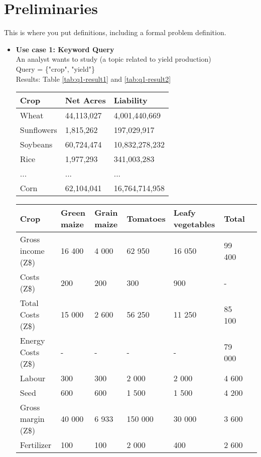 \section{Preliminaries}
\label{sec:preliminaries}
This is where you put definitions, including a formal problem definition.

\begin{itemize}
	\item \textbf{Use case 1: Keyword Query}\\
	An analyst wants to study (a topic related to yield production)\\
	Query = \{"crop", "yield"\}\\
	Results: Table \ref{tab:q1-result1} and \ref{tab:q1-result2}
	\begin{table*}[t]
		\setlength{\tabcolsep}{0.9\tabcolsep}
		\begin{tabular}{ |l|l|l|  }
			\hline
			Crop	& Net Acres	& Liability\\
			\hline
			Wheat 	& 44,113,027 	& 4,001,440,669\\
			Sunflowers 	& 1,815,262 	& 197,029,917\\
			Soybeans 	& 60,724,474 	& 10,832,278,232\\
			Rice 	& 1,977,293 	& 341,003,283\\
			...		& ...			& ...\\
			Corn 	& 62,104,041 	& 16,764,714,958\\
			\hline
			
		\end{tabular}
	\vspace{.2cm}
	\label{tab:q1-result1}
	\caption{2006 Top ten insured crops by net acres}
	\end{table*}
	
	\begin{table*}[t]
		\setlength{\tabcolsep}{0.9\tabcolsep}
		\begin{tabular}{ |l|l|l|l|l|l|l|  }
			\hline
			Crop 	&Green maize 	&Grain maize 	&Tomatoes 	&Leafy vegetables 	&Total\\
			\hline
			Gross income (Z\$) 	&16 400 	&4 000 	&62 950 	&16 050 	&99 400\\
			Costs (Z\$) 		&200 	&200 	&300 	&900 & - \\
			Total Costs (Z\$)  &15 000 	&2 600 	&56 250 	&11 250 	&85 100\\
			Energy Costs (Z\$) & - & - & -  & - &79 000\\
			Labour 	&300 	&300 	&2 000 	&2 000 &	4 600\\
			Seed &	600 	&600 &	1 500 &	1 500 &	4 200\\
			Gross margin (Z\$) 	&40 000 	&6 933 	&150 000 &	30 000 &	3 600\\
			Fertilizer &	100 &	100 &	2 000 &	400 &	2 600\\
			\hline
			

\end{tabular}
\end{table*}
\end{itemize}
